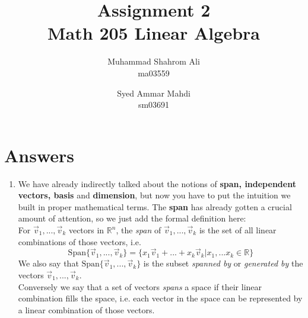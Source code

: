\documentclass[a4paper, 11pt]{article}
\title{Assignment 2 \\ Math 205 Linear Algebra}
\author{
  Muhammad Shahrom Ali\\ ma03559
  \and
  Syed Ammar Mahdi\\  sm03691
}
\begin{document}
\setlength{\parskip}{10pt} %
\setlength{\parindent}{0pt}
\maketitle




\section{Answers}


\begin{enumerate} 

\item We have already indirectly talked about the notions of \textbf{span, independent vectors, basis} and \textbf{dimension}, but now you have to put the intuition we built in proper mathematical terms. 
The \textbf{span} has already gotten a crucial amount of attention, so we just add the formal definition here:\\


For $\vec v_1,..., \vec v_k$ vectors in $\mathbb{R}^n$, the \textit{span} of $\vec v_1,..., \vec v_k$ is the set of all linear combinations of those vectors, i.e.
$$\text{Span} \{\vec v_1,..., \vec v_k \} = \{ x_1 \vec v_1 + ... + x_k \vec v_k | x_1,...x_k \in \mathbb{R}\}$$
We also say that $\text{Span} \{\vec v_1,...,\vec v_k \} $ is the subset \textit{spanned by} or \textit{generated by} the vectors $\vec v_1,..., \vec v_k$. \\
Conversely we say that a set of vectors \textit{spans} a space if their linear combination fills the space, i.e. each vector in the space can be represented by a linear combination of those vectors. \\


\end{enumerate}
\end{document}
